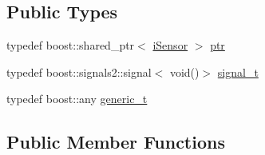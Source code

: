 \subsection*{Public Types}
\begin{DoxyCompactItemize}
\item 
typedef boost\+::shared\+\_\+ptr$<$ \hyperlink{classo_cpt_1_1i_sensor}{i\+Sensor} $>$ \hyperlink{classo_cpt_1_1i_sensor_a03533d2c5dc66e332d70dbb3b5e3006a}{ptr}
\item 
typedef boost\+::signals2\+::signal$<$ void()$>$ \hyperlink{classo_cpt_1_1i_sensor_a2e6d170acbc05f0b557bb68671813f6d}{signal\+\_\+t}
\item 
typedef boost\+::any \hyperlink{classo_cpt_1_1i_sensor_a8c83eafe5bdc0074a8c2c405023ee204}{generic\+\_\+t}
\end{DoxyCompactItemize}
\subsection*{Public Member Functions}
